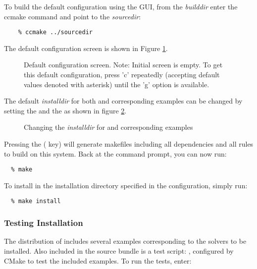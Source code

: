 To build the default configuration using the GUI, from the {\em builddir} enter
the ccmake command and point to the {\em sourcedir}:

\begin{verbatim}
    % ccmake ../sourcedir
\end{verbatim}

The default configuration screen is shown in Figure
\ref{f:ccmakedefault}. 
\begin{figure}[!ht]
{\centerline{}}
\caption [Initial {\em ccmake} configuration screen]
{Default configuration screen. Note: Initial screen is empty.
To get this default configuration, press 'c' repeatedly (accepting default values denoted with asterisk)
until the 'g' option is available.}
\label{f:ccmakedefault}
\end{figure}

The default {\em installdir} for both {\sundials} and corresponding examples
can be changed by setting the  and
the  as shown in figure
\ref{f:ccmakeprefix}. 
\begin{figure}[!ht]
{\centerline{}}
\caption [Changing the {\em installdir}]
{Changing the {\em installdir} for {\sundials} and
corresponding {\id examples} }
\label{f:ccmakeprefix}
\end{figure}

Pressing the ( key) will generate makefiles including all dependencies
and all rules to build {\sundials} on this system. 
Back at the command prompt, you can now run:

\begin{verbatim}
  % make
\end{verbatim}

To install {\sundials} in the installation directory specified in the configuration, simply run:

\begin{verbatim}
  % make install
\end{verbatim}

\subsubsection*{Testing Installation}
The distribution of {\sundials} includes several examples corresponding to the solvers to be
installed. Also included in the source bundle is a test script: , configured by CMake
to test the included examples.
To run the tests, enter:

